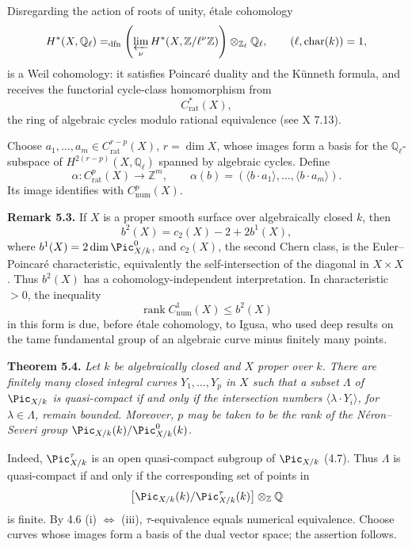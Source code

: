 Disregarding the action of roots of unity, \'etale cohomology
\[
H^*(X,\mathbb Q_\ell)
=_{\mathrm{dfn}}
\left(\varprojlim_\nu H^*(X,\mathbb Z/\ell^\nu\mathbb Z)\right)
\otimes_{\mathbb Z_\ell}\mathbb Q_\ell,
\qquad(\ell,\operatorname{char}(k))=1,
\]
is a Weil cohomology: it satisfies Poincar\'e duality and the K\"unneth
formula, and receives the functorial cycle-class homomorphism from
\[
C^*_{\mathrm{rat}}(X),
\]
the ring of algebraic cycles modulo rational equivalence (see X 7.13).

Choose \(a_1,\ldots,a_m\in C^{r-p}_{\mathrm{rat}}(X)\), \(r=\dim X\),
whose images form a basis for the \(\mathbb Q_\ell\)-subspace of
\(H^{2(r-p)}(X,\mathbb Q_\ell)\) spanned by algebraic cycles. Define
\[
\alpha:C^p_{\mathrm{rat}}(X)\longrightarrow\mathbb Z^m,\qquad
\alpha(b)=
(\langle b\cdot a_1\rangle,\ldots,\langle b\cdot a_m\rangle).
\]
Its image identifies with \(C^p_{\mathrm{num}}(X)\).

\textbf{Remark 5.3.} If \(X\) is a proper smooth surface over
algebraically closed \(k\), then
\[
b^2(X)=c_2(X)-2+2b^1(X),
\]
where \(b^1(X)=2\dim\Pic^0_{X/k}\), and \(c_2(X)\), the second Chern
class, is the Euler--Poincar\'e characteristic, equivalently the
self-intersection of the diagonal in \(X\times X\). Thus \(b^2(X)\) has
a cohomology-independent interpretation. In characteristic \(>0\), the
inequality
\[
\operatorname{rank}C^1_{\mathrm{num}}(X)\le b^2(X)
\]
in this form is due, before \'etale cohomology, to Igusa, who used deep
results on the tame fundamental group of an algebraic curve minus
finitely many points.

\textbf{Theorem 5.4.} \emph{Let \(k\) be algebraically closed and \(X\)
proper over \(k\). There are finitely many closed integral curves
\(Y_1,\ldots,Y_p\) in \(X\) such that a subset \(\Lambda\) of
\(\Pic_{X/k}\) is quasi-compact if and only if the intersection numbers
\(\langle\lambda\cdot Y_i\rangle\), for \(\lambda\in\Lambda\), remain
bounded. Moreover, \(p\) may be taken to be the rank of the
N\'eron--Severi group \(\Pic_{X/k}(k)/\Pic^0_{X/k}(k)\).}

Indeed, \(\Pic^\tau_{X/k}\) is an open quasi-compact subgroup of
\(\Pic_{X/k}\) (4.7). Thus \(\Lambda\) is quasi-compact if and only if
the corresponding set of points in
\[
\bigl[\Pic_{X/k}(k)/\Pic^\tau_{X/k}(k)\bigr]
\otimes_{\mathbb Z}\mathbb Q
\]
is finite. By 4.6 (i) \(\Longleftrightarrow\) (iii),
\(\tau\)-equivalence equals numerical equivalence. Choose curves whose
images form a basis of the dual vector space; the assertion follows.

